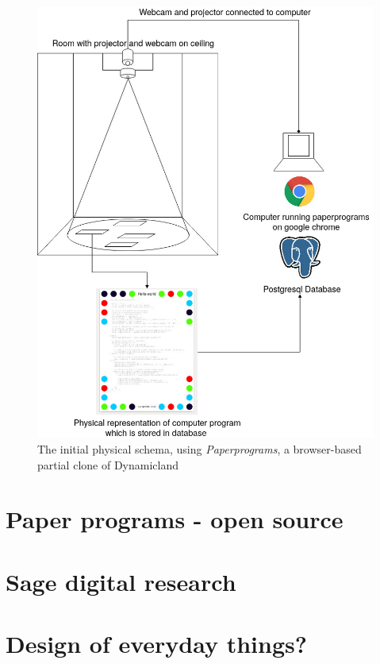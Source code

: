 \documentclass[12pt]{report}
\begin{document}
\begin{figure}[htbp]
\centering
\includegraphics[width=15cm]{assets/pp-diag.png}
\caption{The initial physical schema, using \emph{Paperprograms}, a browser-based partial clone of Dynamicland \label{pp-schema}}
\end{figure}



\section{Paper programs - open source}
\label{sec:orga8cea4f}

\section{Sage digital research}
\label{sec:org0d3c0aa}

\section{Design of everyday things?}
\label{sec:orga1df800}
\end{document}
